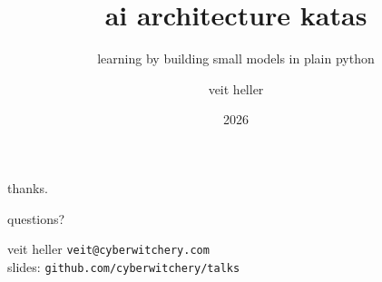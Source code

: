 \documentclass[aspectratio=1610,14pt]{beamer}
\title{ai architecture katas}
\subtitle{learning by building small models in plain python}
\author{veit heller}
\institute{cyberwitchery lab}
\date{2026}
\begin{document}
  {
  \begin{frame}[plain]
    \cwlogoright[cwGhost]{0.42\paperheight}%
    \titlepage
  \end{frame}}

  

  {
  \begin{frame}[plain]
    \cwlogoright[cwInk]{0.42\paperheight}%
    \paperheight
    \begin{minipage}{0.62\textwidth}
      {\color{cwInk}thanks.}\par\vskip12pt
      {\cwhanken\large\color{cwTeal}questions?}\par
      \paperheight
      {\cwhanken\color{cwMuted}veit heller \quad \texttt{veit@cyberwitchery.com}}\\[5pt]
      {\cwhanken\color{cwFaint}slides: \texttt{github.com/cyberwitchery/talks}}
    \end{minipage}
  \end{frame}}
\end{document}
